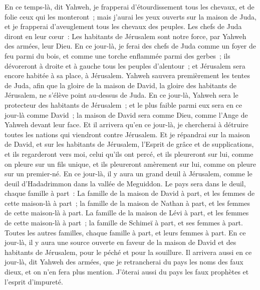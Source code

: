 \begin{multicols}{2}
En ce temps-là, dit Yahweh, je frapperai d'étourdissement tous les chevaux, et de folie ceux qui les monteront~; mais j'aurai les yeux ouverts sur la maison de Juda, et je frapperai d'aveuglement tous les chevaux des peuples.
Les chefs de Juda diront en leur cœur~: Les habitants de Jérusalem sont notre force, par Yahweh des armées, leur Dieu.
En ce jour-là, je ferai des chefs de Juda comme un foyer de feu parmi du bois, et comme une torche enflammée parmi des gerbes~; ils dévoreront à droite et à gauche tous les peuples d'alentour~; et Jérusalem sera encore habitée à sa place, à Jérusalem.
Yahweh sauvera premièrement les tentes de Juda, afin que la gloire de la maison de David, la gloire des habitants de Jérusalem, ne s'élève point au-dessus de Juda.
En ce jour-là, Yahweh sera le protecteur des habitants de Jérusalem~; et le plus faible parmi eux sera en ce jour-là comme David~; la maison de David sera comme Dieu, comme l'Ange de Yahweh devant leur face.
Et il arrivera qu'en ce jour-là, je chercherai à détruire toutes les nations qui viendront contre Jérusalem.
Et je répandrai sur la maison de David, et sur les habitants de Jérusalem, l'Esprit de grâce et de supplications, et ils regarderont vers moi, celui qu'ils ont percé, et ils pleureront sur lui, comme on pleure sur un fils unique, et ils pleureront amèrement sur lui, comme on pleure sur un premier-né.
En ce jour-là, il y aura un grand deuil à Jérusalem, comme le deuil d'Hadadrimmon dans la vallée de Meguiddon.
Le pays sera dans le deuil, chaque famille à part~: La famille de la maison de David à part, et les femmes de cette maison-là à part~; la famille de la maison de Nathan à part, et les femmes de cette maison-là à part.
La famille de la maison de Lévi à part, et les femmes de cette maison-là à part~; la famille de Schimeï à part, et ses femmes à part.
Toutes les autres familles, chaque famille à part, et leurs femmes à part.
\VerseOne{}En ce jour-là, il y aura une source ouverte en faveur de la maison de David et des habitants de Jérusalem, pour le péché et pour la souillure.
Il arrivera aussi en ce jour-là, dit Yahweh des armées, que je retrancherai du pays les noms des faux dieux, et on n'en fera plus mention. J'ôterai aussi du pays les faux prophètes et l'esprit d'impureté.

\end{multicols}
